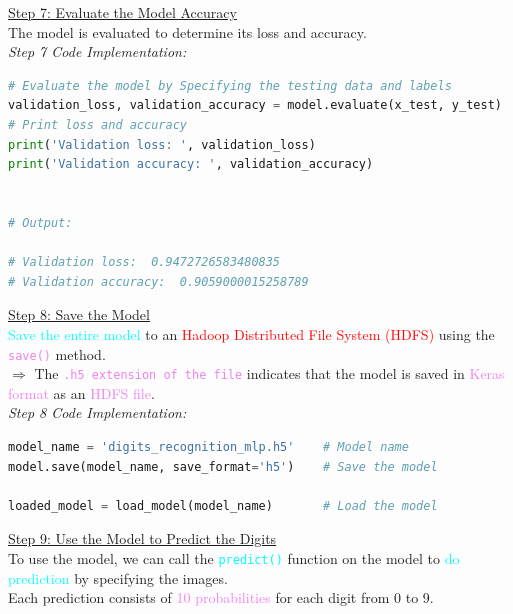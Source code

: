 \documentclass{book}
\begin{document}
\uline{Step 7: Evaluate the Model Accuracy}\\
\vspace{1mm}
The model is evaluated to determine its loss and accuracy.\\
\vspace{3mm}
\textit{\large{Step 7 Code Implementation:}}
\begin{lstlisting}[language=Python, basicstyle=\ttfamily\small, keywordstyle=\color{blue}, commentstyle=\color{forestgreen}, stringstyle=\color{red}, showstringspaces=false]
# Evaluate the model by Specifying the testing data and labels
validation_loss, validation_accuracy = model.evaluate(x_test, y_test)
# Print loss and accuracy
print('Validation loss: ', validation_loss)
print('Validation accuracy: ', validation_accuracy)


# Output:

# Validation loss:  0.9472726583480835
# Validation accuracy:  0.9059000015258789
\end{lstlisting}
\uline{Step 8: Save the Model}\\
\vspace{1mm}
\textcolor{cyan}{Save the entire model} to an \textcolor{red}{Hadoop Distributed File System (HDFS)} using the \textcolor{violet}{\texttt{save()}} method.\\
$\Rightarrow$ The \textcolor{violet}{\texttt{.h5 extension of the file}} indicates that the model is saved in \textcolor{violet}{Keras format} as an \textcolor{violet}{HDFS file}.\\
\vspace{3mm}
\textit{\large{Step 8 Code Implementation:}}
\begin{lstlisting}[language=Python, basicstyle=\ttfamily\small, keywordstyle=\color{blue}, commentstyle=\color{forestgreen}, stringstyle=\color{red}, showstringspaces=false]
model_name = 'digits_recognition_mlp.h5'    # Model name
model.save(model_name, save_format='h5')    # Save the model

loaded_model = load_model(model_name)       # Load the model
\end{lstlisting}
\uline{Step 9: Use the Model to Predict the Digits}\\
\vspace{1mm}
To use the model, we can call the \textcolor{cyan}{\texttt{predict()}} function on the model to \textcolor{cyan}{do prediction} by specifying the images.\\
Each prediction consists of \textcolor{violet}{10 probabilities} for each digit from 0 to 9.\\
\end{document}
